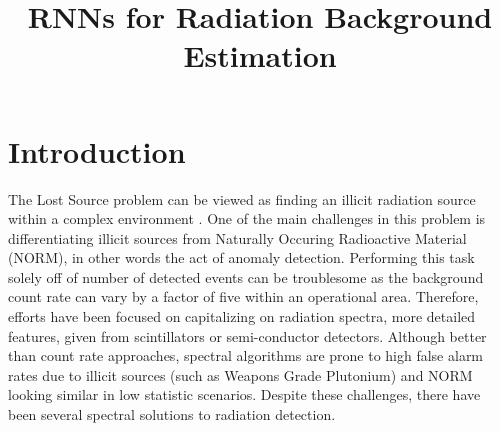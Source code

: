 \documentclass[conference]{IEEEtran}
\begin{document}
\title{RNNs for Radiation Background Estimation\\
}

\author{
\and
{}
}

\maketitle

\begin{abstract}
\end{abstract}

\begin{IEEEkeywords}
\end{IEEEkeywords}

\section{Introduction}

The Lost Source problem can be viewed as finding an illicit radiation source within a complex environment \cite{ziock}. One of the main challenges in this problem is differentiating illicit sources from Naturally Occuring Radioactive Material (NORM), in other words the act of anomaly detection. Performing this task solely off of number of detected events can be troublesome as the background count rate can vary by a factor of five within an operational area. Therefore, efforts have been focused on capitalizing on radiation spectra, more detailed features, given from scintillators or semi-conductor detectors. Although better than count rate approaches, spectral algorithms are prone to high false alarm rates due to illicit sources (such as Weapons Grade Plutonium) and NORM looking similar in low statistic scenarios. Despite these challenges, there have been several spectral solutions to radiation detection.
\end{document}
